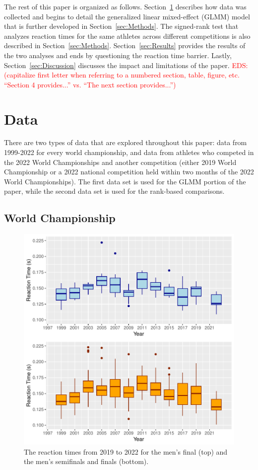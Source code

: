 \documentclass[12pt, letterpaper, titlepage]{article}
\newcommand{\eds}[1]{\textcolor{red}{EDS: (#1)}}
\begin{document}
The rest of this paper is organized as follows. Section~\ref{sec:Data} describes 
how data was collected and begins to detail the generalized linear mixed-effect 
(GLMM) model that is further developed in Section~\ref{sec:Methods}. The 
signed-rank test that analyzes reaction times for the same athletes across
different competitions is
also described in Section~\ref{sec:Methods}.  Section~\ref{sec:Results}
 provides the results of the two analyses and ends 
by questioning the reaction time barrier.  Lastly, Section~\ref{sec:Discussion}
discusses the impact and limitations of the paper.
\eds{capitalize first letter when referring to a numbered section, table, figure, 
etc. ``Section 4 provides...'' vs. ``The next section provides...''}


\section{Data} \label{sec:Data}

There are two types of data that are explored throughout this paper: data from
1999-2022 for every world championship, and data from athletes who competed in
the 2022 World Championships and another competition (either 2019 World 
Championship or a 2022 national competition held within two months of the  
2022 World Championships). The first data set is used for the GLMM portion
of the paper, while the second data set is used for the rank-based comparisons.

\subsection{World Championship}\label{sec:dataworld}


\begin{figure}[tbp]
  \centering
  \includegraphics{Finals_Pooled_Boxplot}
  \caption{The reaction times from 2019 to 2022 for the men's final (top) and
  the men's semifinals and finals (bottom).}
  \label{fig:Boxplots}
\end{figure}
\end{document}
